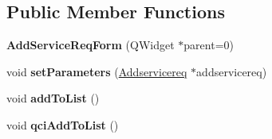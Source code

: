 \subsection*{Public Member Functions}
\begin{DoxyCompactItemize}
\item 
{\bfseries Add\+Service\+Req\+Form} (Q\+Widget $\ast$parent=0)\hypertarget{class_add_service_req_form_a0cfccd55795702e71dcd0d4b4893f345}{}\label{class_add_service_req_form_a0cfccd55795702e71dcd0d4b4893f345}

\item 
void {\bfseries set\+Parameters} (\hyperlink{class_addservicereq}{Addservicereq} $\ast$addservicereq)\hypertarget{class_add_service_req_form_ac78b1e7887494dc5f3f8e9fbc8097cf1}{}\label{class_add_service_req_form_ac78b1e7887494dc5f3f8e9fbc8097cf1}

\item 
void {\bfseries add\+To\+List} ()\hypertarget{class_add_service_req_form_a25e237b83dd4b9b8e05ada6804048bdb}{}\label{class_add_service_req_form_a25e237b83dd4b9b8e05ada6804048bdb}

\item 
void {\bfseries qci\+Add\+To\+List} ()\hypertarget{class_add_service_req_form_a2133f062f4e58f37cfa626433438b447}{}\label{class_add_service_req_form_a2133f062f4e58f37cfa626433438b447}

\end{DoxyCompactItemize}

